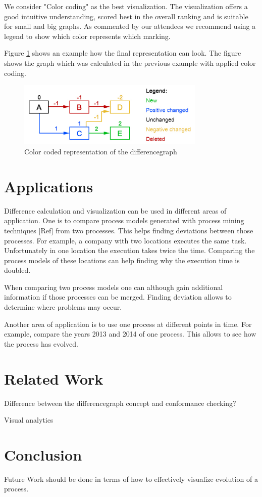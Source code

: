 \documentclass{llncs}
\begin{document}
We consider "Color coding" as the best visualization. The visualization offers a good intuitive understanding, scored best in the overall ranking and is suitable for small and big graphs. As commented by our attendees we recommend using a legend to show which color represents which marking.

Figure \ref{fig:DiffGraphVisualization} shows an example how the final representation can look. The figure shows the graph which was calculated in the previous example with applied color coding.

\begin{figure}
	\centering
	\includegraphics[width=0.8\textwidth]{Images/ColorCodedGraph.PNG}
	\caption{Color coded representation of the differencegraph}
	\label{fig:DiffGraphVisualization}
\end{figure}


\section{Applications}  %
\label{sec:Applications}

Difference calculation and visualization can be used in different areas of application. One is to compare process models generated with process mining techniques [Ref] from two processes. This helps finding deviations between those processes. For example, a company with two locations executes the same task. Unfortunately in one location the execution takes twice the time. Comparing the process models of these locations can help finding why the execution time is doubled.

When comparing two process models one can although gain additional information if those processes can be merged. Finding deviation allows to determine where problems may occur.

Another area of application is to use one process at different points in time. For example, compare the years 2013 and 2014 of one process. This allows to see how the process has evolved.

\section{Related Work}  %
\label{sec:RelatedWork}

Difference between the differencegraph concept and conformance checking?

Visual analytics


\section{Conclusion} %
\label{sec:Conclusion}



Future Work should be done in terms of how to effectively visualize evolution of a process.




\end{document}
